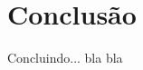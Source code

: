 \documentclass[
	12pt,				%
	oneside,			%
	a4paper,			%
	english,			%
	french,				%
	spanish,			%
	brazil,				%
	]{abntex2}
\begin{document}
\newpage
\section[Conclusão]{Conclusão}
\pagestyle{fancy}%

Concluindo... bla bla

\postextual



%
%
\end{document}
